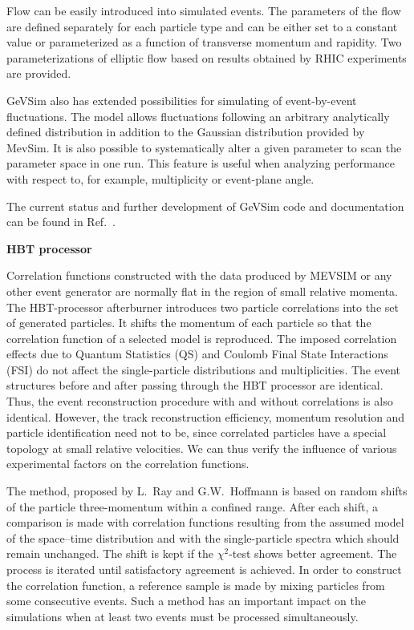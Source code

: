 \documentclass[12pt,a4paper,twoside]{article}
\begin{document}
Flow can be easily introduced into simulated events. The parameters of
the flow are defined separately for each particle type and can be
either set to a constant value or parameterized as a function of
transverse momentum and rapidity. Two parameterizations of elliptic
flow based on results obtained by RHIC experiments are provided.

GeVSim also has extended possibilities for simulating of
event-by-event fluctuations.  The model allows fluctuations
following an arbitrary analytically defined distribution in
addition to the Gaussian distribution provided by MevSim. It is
also possible to systematically alter a given parameter to scan
the parameter space in one run. This feature is useful when
analyzing performance with respect to, for example, multiplicity
or event-plane angle.

The current status and further development of GeVSim code and documentation
can be found in Ref.~\cite{MC:Radomski}.

\textbf{HBT processor}

Correlation functions constructed with the data produced by MEVSIM
or any other event generator are normally flat in the region of
small relative momenta.  The HBT-processor afterburner introduces
two particle correlations into the set of generated particles.  It
shifts the momentum of each particle so that the correlation
function of a selected model is reproduced.  The imposed
correlation effects due to Quantum Statistics (QS) and Coulomb
Final State Interactions (FSI) do not affect the single-particle
distributions and multiplicities. The event structures before and
after passing through the HBT processor are identical.  Thus, the
event reconstruction procedure with and without correlations is
also identical. However, the track reconstruction efficiency, momentum
resolution and particle identification need not to be, since
correlated particles have a special topology at small relative
velocities. We can thus verify the influence of various
experimental factors on the correlation functions.

The method, proposed by L.~Ray and G.W.~Hoffmann \cite{MC:HBTproc}
is based on random shifts of the particle three-momentum within a
confined range.  After each shift, a comparison is made with
correlation functions resulting from the assumed model of the
space--time distribution and with the single-particle spectra
which should remain unchanged.  The shift is kept if the
$\chi^2$-test shows better agreement.  The process is iterated
until satisfactory agreement is achieved.  In order to construct
the correlation function, a reference sample is made by mixing
particles from some consecutive events.  Such a method has an
important impact on the simulations when at least two events must
be processed simultaneously.
\end{document}
